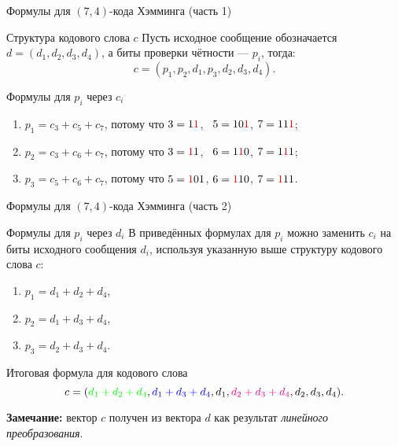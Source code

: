 \begin{frame}{Формулы для $(7,4)$-кода Хэмминга (часть 1)}

\begin{block}{Структура кодового слова $c$}
Пусть исходное сообщение обозначается $d=(d_1, d_2, d_3, d_4)$, а биты проверки чётности — $p_i$, тогда:
\[
    c = (p_1, p_2, d_1, p_3, d_2, d_3, d_4).
\]
\end{block}

\begin{block}{Формулы для $p_i$ через $c_i$}
\begin{enumerate}
    \item $p_1 = c_3 + c_5 + c_7$,
        потому что $3 = 1 \color{red} 1$, \ $5 = 1 0 \color{red} 1$,
            $7 = 1 1 \color{red} 1$;
    \item $p_2 = c_3 + c_6 + c_7 $,
        потому что $3 = \textcolor{red}{1} 1$, \ $6 = 1\textcolor{red}{1}0$,
            $7 = 1\textcolor{red}{1}1$;
    \item $p_3 = c_5 + c_6 + c_7 $,
        потому что $5 = \textcolor{red}{1} 01$, $6 = \textcolor{red}{1}10$,
            $7 = \textcolor{red}{1}11$.
\end{enumerate}
\end{block}
\end{frame}

\begin{frame}{Формулы для $(7,4)$-кода Хэмминга (часть 2)}

\begin{block}{Формулы для $p_i$ через $d_i$}
В приведённых формулах для $p_i$ можно заменить $c_i$ на биты исходного сообщения $d_i$, используя указанную выше структуру кодового слова $c$:
\begin{enumerate}
    \item $p_1 = d_1 + d_2 + d_4$,
    \item $p_2 = d_1 + d_3 + d_4$,
    \item $p_3 = d_2 + d_3 + d_4$.
\end{enumerate}
\end{block}

\begin{block}{Итоговая формула для кодового слова}
\[
    c = (
        \textcolor{green}{d_1 + d_2 + d_4},
        \textcolor{blue}{d_1 + d_3 + d_4},
        d_1,
        \textcolor{magenta}{d_2 + d_3 + d_4},
        d_2,
        d_3,
        d_4).
\]

\textbf{Замечание:} вектор $c$ получен из вектора $d$ как результат \emph{линейного преобразования}.
\end{block}

\end{frame}

